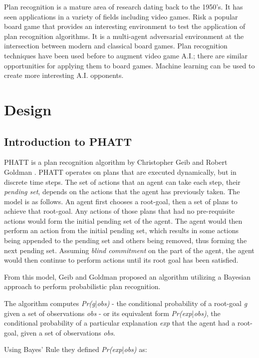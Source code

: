 \documentclass[parskip]{cs4rep}
\begin{document}
Plan recognition is a mature area of research dating back to the 1950's. It has seen applications in a variety of fields including video games. Risk a popular board game that provides an interesting environment to test the application of plan recognition algorithms. It is a multi-agent adversarial environment at the intersection between modern and classical board games. Plan recognition techniques have been used before to augment video game A.I.; there are similar opportunities for applying them to board games. Machine learning can be used to create more interesting A.I. opponents.

\chapter{Design}

\section{Introduction to PHATT}

PHATT is a plan recognition algorithm by Christopher Geib and Robert Goldman \cite{Geib:2009:PPR:1550966.1551246}. PHATT operates on plans that are executed dynamically, but in discrete time steps. The set of actions that an agent can take each step, their \textit{pending set}, depends on the actions that the agent has previously taken.
The model is as follows. An agent first chooses a root-goal, then a set of plans to achieve that root-goal. Any actions of those plans that had no pre-requisite actions would form the initial pending set of the agent. The agent would then perform an action from the initial pending set, which results in some actions being appended to the pending set and others being removed, thus forming the next pending set. Assuming \textit{blind commitment} on the part of the agent, the agent would then continue to perform actions until its root goal has been satisfied.

From this model, Geib and Goldman proposed an algorithm utilizing a Bayesian approach to perform probabilistic plan recognition. 

The algorithm computes \textit{Pr(g}|\textit{obs)} - the conditional probability of a root-goal \textit{g} given a set of observations \textit{obs} - or its equivalent form \textit{Pr(exp}|\textit{obs)}, the conditional probability of a particular explanation \textit{exp} that the agent had a root-goal, given a set of observations \textit{obs}.

Using Bayes’ Rule they defined \textit{Pr(exp}|\textit{obs)} as:\newline
\end{document}
